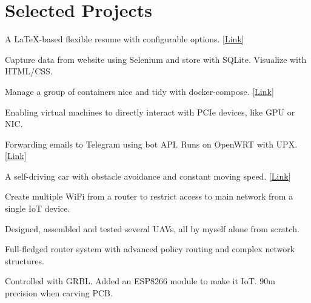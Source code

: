 \documentclass[letterpaper,11pt]{article}
\newcommand{\resumeSubHeadingListStart}{\begin{itemize}[leftmargin=0pt,label={}]}
\newcommand{\resumeSubHeadingListEnd}{\end{itemize}}
\begin{document}
\section{Selected Projects}{
    \resumeSubHeadingListStart
        {A \LaTeX-based flexible resume with configurable options. [\href{https://github.com/ly4096x/Flexible_Resume}{\underline{Link}}]}{}

        {Capture data from website using Selenium and store with SQLite. Visualize with HTML/CSS.}{}

        {Manage a group of containers nice and tidy with docker-compose. [\href{https://github.com/ly4096x/ECE6383_HSN_Lab4_Network}{\underline{Link}}]}{}

        {Enabling virtual machines to directly interact with PCIe devices, like GPU or NIC.}{}

        {Forwarding emails to Telegram using bot API. Runs on OpenWRT with UPX. [\href{https://github.com/ly4096x/smtp_to_telegram}{\underline{Link}}]}{}

        {A self-driving car with obstacle avoidance and constant moving speed. [\href{https://github.com/ly4096x/RTES_STM32F4}{\underline{Link}}]}{}

        {Create multiple WiFi from a router to restrict access to main network from a single IoT device.}{}

        {Designed, assembled and tested several UAVs, all by myself alone from scratch.}{}

        {Full-fledged router system with advanced policy routing and complex network structures.}{}

        {Controlled with GRBL. Added an ESP8266 module to make it IoT. 90{\textmu}m precision when carving PCB.}{}
    \resumeSubHeadingListEnd
}
\fi

\end{document}
